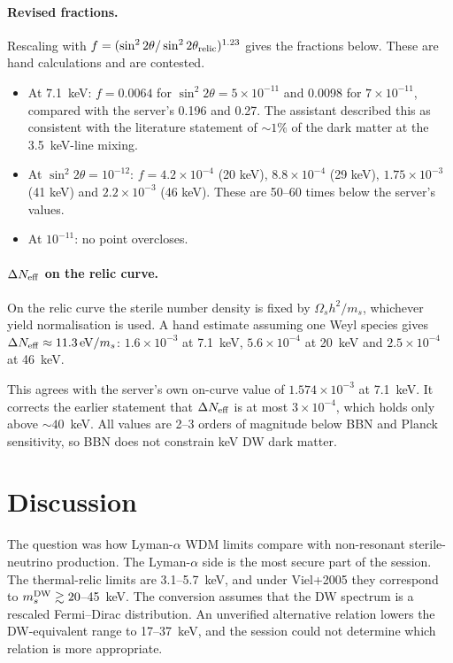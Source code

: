 \documentclass[11pt,a4paper]{article}
\begin{document}
\paragraph{Revised fractions.} Rescaling with $f=(\sin^2 2\theta/\sin^2 2\theta_{\rm relic})^{1.23}$ gives the fractions below. These are hand calculations and are contested.
\begin{itemize}
\item At 7.1~keV: $f=0.0064$ for $\sin^2 2\theta = 5\times10^{-11}$ and 0.0098 for $7\times10^{-11}$, compared with the server's 0.196 and 0.27. The assistant described this as consistent with the literature statement of $\sim1\%$ of the dark matter at the 3.5~keV-line mixing.
\item At $\sin^2 2\theta=10^{-12}$: $f=4.2\times10^{-4}$ (20 keV), $8.8\times10^{-4}$ (29 keV), $1.75\times10^{-3}$ (41 keV) and $2.2\times10^{-3}$ (46 keV). These are 50--60 times below the server's values.
\item At $10^{-11}$: no point overcloses.
\end{itemize}

\paragraph{$\Delta N_{\rm eff}$ on the relic curve.} On the relic curve the sterile number density is fixed by $\Omega_s h^2/m_s$, whichever yield normalisation is used. A hand estimate assuming one Weyl species gives $\Delta N_{\rm eff}\approx 11.3\,{\rm eV}/m_s$: $1.6\times10^{-3}$ at 7.1~keV, $5.6\times10^{-4}$ at 20~keV and $2.5\times10^{-4}$ at 46~keV.

This agrees with the server's own on-curve value of $1.574\times10^{-3}$ at 7.1~keV. It corrects the earlier statement that $\Delta N_{\rm eff}$ is at most $3\times10^{-4}$, which holds only above $\sim40$~keV. All values are 2--3 orders of magnitude below BBN and Planck sensitivity, so BBN does not constrain keV DW dark matter.

\section{Discussion}

The question was how Lyman-$\alpha$ WDM limits compare with non-resonant sterile-neutrino production. The Lyman-$\alpha$ side is the most secure part of the session. The thermal-relic limits are 3.1--5.7~keV, and under Viel+2005 they correspond to $m_s^{\rm DW}\gtrsim20$--45~keV. The conversion assumes that the DW spectrum is a rescaled Fermi--Dirac distribution. An unverified alternative relation lowers the DW-equivalent range to 17--37~keV, and the session could not determine which relation is more appropriate.
\end{document}
